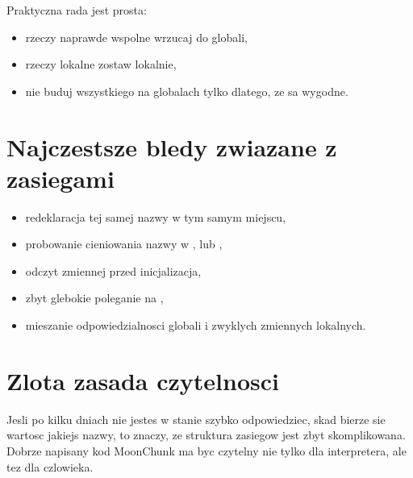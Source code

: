 Praktyczna rada jest prosta:

\begin{itemize}
  \item rzeczy naprawde wspolne wrzucaj do globali,
  \item rzeczy lokalne zostaw lokalnie,
  \item nie buduj wszystkiego na globalach tylko dlatego, ze sa wygodne.
\end{itemize}

\section{Najczestsze bledy zwiazane z zasiegami}
\begin{itemize}
  \item redeklaracja tej samej nazwy w tym samym miejscu,
  \item probowanie cieniowania nazwy w ,  lub ,
  \item odczyt zmiennej przed inicjalizacja,
  \item zbyt glebokie poleganie na ,
  \item mieszanie odpowiedzialnosci globali i zwyklych zmiennych lokalnych.
\end{itemize}

\section{Zlota zasada czytelnosci}
Jesli po kilku dniach nie jestes w stanie szybko odpowiedziec, skad bierze sie wartosc
jakiejs nazwy, to znaczy, ze struktura zasiegow jest zbyt skomplikowana. Dobrze napisany
kod MoonChunk ma byc czytelny nie tylko dla interpretera, ale tez dla czlowieka.
